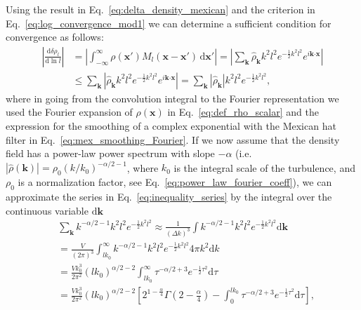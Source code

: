 \documentclass[]{article}
\newcommand{\bcdot}{\bm{\cdot}}
\begin{document}
Using the result in Eq.~\eqref{eq:delta_density_mexican} and the criterion in Eq.~\eqref{eq:log_convergence_mod1} we can determine a sufficient condition for convergence as follows:
%
\begin{align}\label{eq:inequality_series}
	\left\lvert\frac{\mathrm{d} \delta \rho_l}{\mathrm{d} \ln l} \right\rvert &= \left\lvert \int_{-\infty}^{\infty} \rho(\bm x') M_l(\bm x-\bm x')\, \mathrm{d}\bm x' \right\rvert = \left\lvert \sum_{\bm k} \hat{\rho}_{\bm k} k^2 l^2 e^{-\frac{1}{2} k^2 l^2} e^{i \bm k \bcdot\bm x} \right\rvert \nonumber \\
	&\leq  \sum_{\bm k} \left\lvert  \hat{\rho}_{\bm k} k^2 l^2 e^{-\frac{1}{2} k^2 l^2} e^{i \bm k \bcdot\bm x} \right\rvert = \sum_{\bm k} \left\lvert  \hat{\rho}_{\bm k} \right\rvert k^2 l^2 e^{-\frac{1}{2} k^2 l^2} ,
\end{align}
%
where in going from the convolution integral to the Fourier representation we used the Fourier expansion of $\rho (\bm x)$ in Eq.~\eqref{eq:def_rho_scalar} and the expression for the smoothing of a complex exponential with the Mexican hat filter in Eq.~\eqref{eq:mex_smoothing_Fourier}. If we now assume that the density field has a power-law power spectrum with slope $-\alpha$ (i.e. $\left\lvert\hat{\rho}(\bm k)\right\rvert = \rho_0 (k/k_0)^{-\alpha / 2 - 1}$, where $k_0$ is the integral scale of the turbulence, and $\rho_0$ is a normalization factor, see Eq.~\eqref{eq:power_law_fourier_coeff}), we can approximate the series in Eq.~\eqref{eq:inequality_series} by the integral over the continuous variable $\mathrm{d} \bm k$
%
\begin{align}\label{eq:iterative_crit_integral}
	&\sum_{\bm k} k^{-\alpha / 2 - 1} k^2 l^2 e^{-\frac{1}{2} k^2 l^2} \approx \frac{1}{(\Delta k)^3} \int k^{-\alpha / 2 - 1} k^2 l^2 e^{-\frac{1}{2} k^2 l^2} \mathrm{d} \bm k \nonumber \\
	&= \frac{V}{(2 \pi)^3} \int_{ lk_0 }^{\infty} k^{-\alpha / 2 - 1} k^2 l^2 e^{-\frac{1}{2} k^2 l^2} 4 \pi k^2 \mathrm{d} k \nonumber \\
	&= \frac{V k_0^3}{2 \pi^2} (lk_0)^{\alpha/2 -2} \int_{lk_0}^{\infty} \tau^{-\alpha / 2 + 3} e^{-\frac{1}{2} \tau^2} \mathrm{d} \tau \nonumber \\
	&= \frac{V k_0^3}{2 \pi^2} (lk_0)^{\alpha/2 -2} \left[ 2^{1-\frac{\alpha }{4}} \Gamma \left(2-\frac{\alpha }{4}\right) - \int_{0}^{lk_0} \tau^{-\alpha / 2 + 3} e^{-\frac{1}{2} \tau^2} \mathrm{d} \tau \right]  ,
\end{align}
\end{document}
